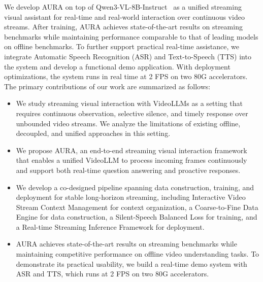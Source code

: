 We develop AURA on top of Qwen3-VL-8B-Instruct~\citep{bai2025qwen3} as a unified streaming visual assistant for real-time and real-world interaction over continuous video streams. After training, AURA achieves state-of-the-art results on streaming benchmarks while maintaining performance comparable to that of leading models on offline benchmarks. To further support practical real-time assistance, we integrate Automatic Speech Recognition (ASR) and Text-to-Speech (TTS) into the system and develop a functional demo application. With deployment optimizations, the system runs in real time at 2 FPS on two 80G accelerators. The primary contributions of our work are summarized as follows:

\begin{itemize}

\item We study streaming visual interaction with VideoLLMs as a setting that requires continuous observation, selective silence, and timely response over unbounded video streams. We analyze the limitations of existing offline, decoupled, and unified approaches in this setting.

\item We propose AURA, an end-to-end streaming visual interaction framework that enables a unified VideoLLM to process incoming frames continuously and support both real-time question answering and proactive responses.

\item We develop a co-designed pipeline spanning data construction, training, and deployment for stable long-horizon streaming, including Interactive Video Stream Context Management for context organization, a Coarse-to-Fine Data Engine for data construction, a Silent-Speech Balanced Loss for training, and a Real-time Streaming Inference Framework for deployment.

\item AURA achieves state-of-the-art results on streaming benchmarks while maintaining competitive performance on offline video understanding tasks. To demonstrate its practical usability, we build a real-time demo system with ASR and TTS, which runs at 2 FPS on two 80G accelerators.

\end{itemize}



